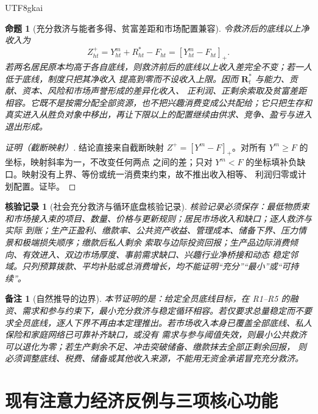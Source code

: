 \documentclass[12pt,a4paper,openany]{report}
\newtheorem{proposition}{命题}[chapter]
\newtheorem{remark}{备注}[chapter]
\newtheorem{Certificate}{核验记录}[chapter]
\begin{document}
\begin{CJK*}{UTF8}{gkai}
\begin{proposition}[充分救济与能者多得、贫富差距和市场配置兼容]
\label{prop:relief-not-equalization}
令救济后的底线以上净收入为
\[
  Z_{ht}^{+}=Y_{ht}^{m}+R_{ht}^{*}-F_{ht}
  =[Y_{ht}^{m}-F_{ht}]_+.
\]
若两名居民原本均高于各自底线，则救济前后的底线以上收入差完全不变；若一人低于底线，制度只把其净收入
提高到零而不设收入上限。因而 \(\mathbf R_t^*\) 与能力、贡献、资本、风险和市场声誉形成的差异化收入、
正利润、正剩余索取及贫富差距相容。它既不是按需分配全部资源，也不把兴趣消费变成公共配给；它只把生存和
真实进入从胜负对象中移出，再让下限以上的配置继续由供求、竞争、盈亏与进入退出形成。
\end{proposition}

\begin{proof}[证明（截断映射）]
结论直接来自截断映射 \(Z^+=[Y^m-F]_+\)。对所有 \(Y^m\ge F\) 的坐标，映射斜率为一，不改变任何两点
之间的差；只对 \(Y^m<F\) 的坐标填补负缺口。映射没有上界、等份或统一消费束约束，故不推出收入相等、
利润归零或计划配置。证毕。
\end{proof}

\begin{Certificate}[社会充分救济与循环底盘核验记录]
核验记录必须保存：最低物质束和市场接入束的项目、数量、价格与更新规则；居民市场收入和缺口；逐人救济与实际
到账；生产正盈利、缴款率、公共资产收益、管理成本、储备下界、压力情景和极端损失顺序；缴款后私人剩余
索取与边际投资回报；生产品边际消费倾向、有效进入、双边市场厚度、事前需求缺口、兴趣行业净桥接和动态
稳定邻域。只列预算拨款、平均补贴或总消费增长，均不能证明“充分”“最小”或“可持续”。
\end{Certificate}

\begin{remark}[自然推导的边界]
本节证明的是：给定全员底线目标，在 R1--R5 的融资、需求和参与约束下，最小充分救济与稳定循环相容。若仅要求总量稳定而不要求全员底线，逐人下界不再由本定理推出。若市场收入本身已覆盖全部底线、私人保险和家庭网络已可靠补齐缺口，或没有
需求与参与阈值失效，则最小公共救济可以退化为零；若生产剩余不足、冲击突破储备、缴款抹去全部正剩余回报，
则必须调整底线、税费、储备或其他收入来源，不能用无资金承诺冒充充分救济。
\end{remark}

\section{现有注意力经济反例与三项核心功能}
\label{sec:attention-counterexample-core-functions}


\end{CJK*}
\end{document}
